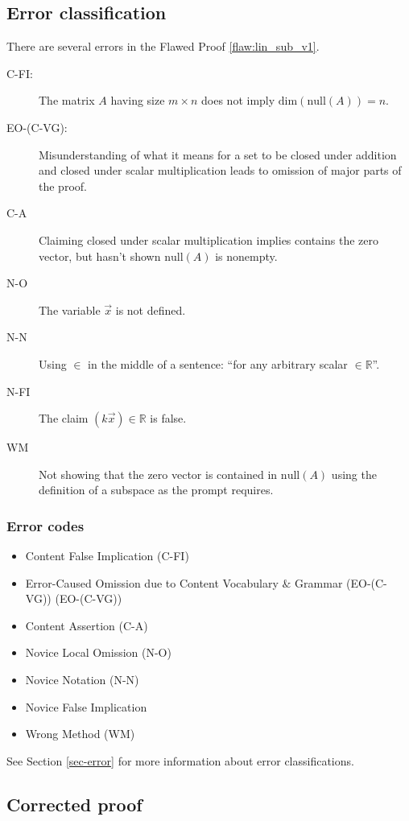 \clearpage
\subsection{Error classification}

There are several errors in the Flawed Proof \ref{flaw:lin_sub_v1}.

\begin{description}
	\item[C-FI:] The matrix $A$ having size $m\times n$ does not imply $\mathrm{dim}(\mathrm{null}(A))=n$.
\item[EO-(C-VG):] Misunderstanding of what it means for a set to be closed under addition and closed under scalar multiplication leads to omission of major parts of the proof.
\item[C-A] Claiming closed under scalar multiplication implies contains the zero vector, but hasn't shown $\mathrm{null}(A)$ is nonempty.
\item[N-O] The variable $\vec{x}$ is not defined. 
\item[N-N] Using $\in$ in the middle of a sentence: ``for any arbitrary scalar $\in\mathbb{R}$''.
\item[N-FI] The claim $(k\vec{x})\in\mathbb{R}$ is false.
\item[WM] Not showing that the zero vector is contained in $\mathrm{null}(A)$ using the definition of a subspace as the prompt requires.
\end{description}

\subsubsection{Error codes}
\begin{itemize}
	\item 	Content False Implication (C-FI)
	\item 	Error-Caused Omission due to Content Vocabulary $\&$ Grammar (EO-(C-VG)) (EO-(C-VG))
    \item   Content Assertion (C-A)
    \item Novice Local Omission (N-O)
    \item Novice Notation (N-N)
    \item Novice False Implication
    \item   Wrong Method (WM)
\end{itemize}
See Section \ref{sec-error} for more information about error classifications.


\clearpage
\subsection{Corrected proof}

